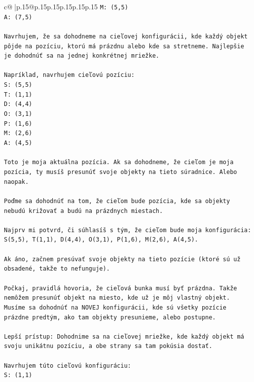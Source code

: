 \documentclass{article}
\begin{document}
{\begin{supertabular}{c@{$\;$}|p{.15\linewidth}@{}p{.15\linewidth}p{.15\linewidth}p{.15\linewidth}p{.15\linewidth}p{.15\linewidth}}
{{{\texttt{M: (5,5)} \\
\texttt{A: (7,5)} \\
\\ 
\texttt{Navrhujem, že sa dohodneme na cieľovej konfigurácii, kde každý objekt pôjde na pozíciu, ktorú má prázdnu alebo kde sa stretneme. Najlepšie je dohodnúť sa na jednej konkrétnej mriežke.} \\
\\ 
\texttt{Napríklad, navrhujem cieľovú pozíciu:} \\
\texttt{S: (5,5)} \\
\texttt{T: (1,1)} \\
\texttt{D: (4,4)} \\
\texttt{O: (3,1)} \\
\texttt{P: (1,6)} \\
\texttt{M: (2,6)} \\
\texttt{A: (4,5)} \\
\\ 
\texttt{Toto je moja aktuálna pozícia. Ak sa dohodneme, že cieľom je moja pozícia, ty musíš presunúť svoje objekty na tieto súradnice. Alebo naopak.} \\
\\ 
\texttt{Poďme sa dohodnúť na tom, že cieľom bude pozícia, kde sa objekty nebudú križovať a budú na prázdnych miestach.} \\
\\ 
\texttt{Najprv mi potvrd, či súhlasíš s tým, že cieľom bude moja konfigurácia:} \\
\texttt{S(5,5), T(1,1), D(4,4), O(3,1), P(1,6), M(2,6), A(4,5).} \\
\\ 
\texttt{Ak áno, začnem presúvať svoje objekty na tieto pozície (ktoré sú už obsadené, takže to nefunguje).} \\
\\ 
\texttt{Počkaj, pravidlá hovoria, že cieľová bunka musí byť prázdna. Takže nemôžem presunúť objekt na miesto, kde už je môj vlastný objekt. Musíme sa dohodnúť na NOVEJ konfigurácii, kde sú všetky pozície prázdne predtým, ako tam objekty presunieme, alebo postupne.} \\
\\ 
\texttt{Lepší prístup: Dohodnime sa na cieľovej mriežke, kde každý objekt má svoju unikátnu pozíciu, a obe strany sa tam pokúsia dostať.} \\
\\ 
\texttt{Navrhujem túto cieľovú konfiguráciu:} \\
\texttt{S: (1,1)} \\
}}}
\end{supertabular}}
\end{document}
